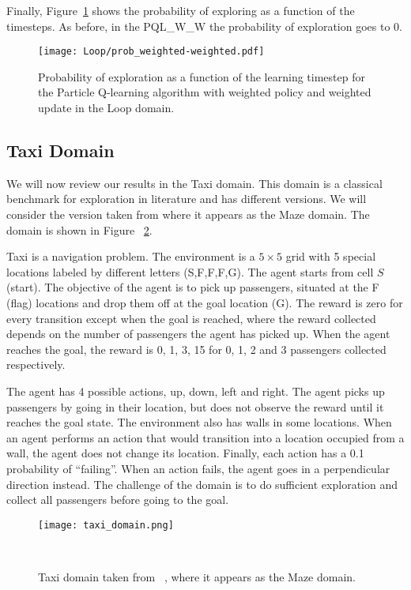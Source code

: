 Finally, Figure~\ref{fig:loop_prob_evolution} shows the probability of exploring as a function of the timesteps. As before, in the PQL\_W\_W the probability of exploration goes to 0.
\begin{figure}
  \centering
  \texttt{[image: Loop/prob\_weighted-weighted.pdf]}
\caption{Probability of exploration as a function of the learning timestep for the Particle Q-learning algorithm with weighted policy and weighted update in the Loop domain.}
\label{fig:loop_prob_evolution}
\end{figure}
\subsection{Taxi Domain}
We will now review our results in the Taxi domain. This domain is a classical benchmark for exploration in literature and has different versions. We will consider the version taken from \cite{Dearden98bayesianq-learning} where it appears as the Maze domain. The domain is shown in Figure ~\ref{fig:taxi_domain}.\par 
Taxi is a navigation problem. The environment is a $5\times5$ grid with 5 special locations labeled by different letters (S,F,F,F,G). The agent starts from cell $S$ (start). The objective of the agent is to pick up passengers, situated at the F (flag) locations and drop them off at the goal location (G). The reward is zero for every transition except when the goal is reached, where the reward collected depends on the number of passengers the agent has picked up. When the agent reaches the goal, the reward is 0, 1, 3, 15 for 0, 1, 2 and 3 passengers collected respectively.\par 
The agent has 4 possible actions, up, down, left and right. The agent picks up passengers by going in their location, but does not observe the reward until it reaches the goal state. The environment also has walls in some locations. When an agent performs an action that would transition into a location occupied from a wall, the agent does not change its location. Finally, each action has a 0.1 probability of ``failing''. When an action fails, the agent goes in a perpendicular direction instead. The challenge of the domain is to do sufficient exploration and collect all passengers before going to the goal.\par
\begin{figure}
 \centering \texttt{[image: taxi\_domain.png]}
 \caption{Taxi domain taken from ~\cite{Dearden98bayesianq-learning}, where it appears as the Maze domain.} ~
 \label{fig:taxi_domain}
\end{figure}
